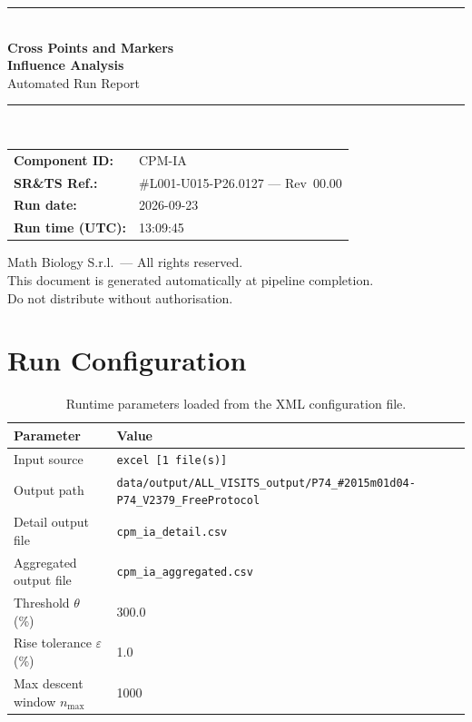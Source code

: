 \documentclass[a4paper,11pt]{article}
\begin{document}
\begin{titlepage}
\begin{center}
  \vspace*{1.8cm}
  {\color{dmaaccent}\rule{\linewidth}{1.5pt}}\\[0.6cm]
  {\LARGE\bfseries\color{dmaaccent}
    Cross Points and Markers\\[0.25cm]
    Influence Analysis}\\[0.4cm]
  {\Large Automated Run Report}\\[0.3cm]
  {\color{dmaaccent}\rule{\linewidth}{1.5pt}}\\[2cm]

  \begin{tabular}{ll}
    \textbf{Component ID:}   & CPM-IA \\[0.3cm]
    \textbf{SR\&TS Ref.:}    & \#L001-U015-P26.0127 --- Rev~00.00 \\[0.3cm]
    \textbf{Run date:}       & 2026-09-23 \\[0.3cm]
    \textbf{Run time (UTC):} & 13:09:45 \\
  \end{tabular}

  \vfill
  {\color{dmagray}\small
    Math Biology S.r.l.\ --- All rights reserved.\\
    This document is generated automatically at pipeline completion.\\
    Do not distribute without authorisation.}
\end{center}
\end{titlepage}

\tableofcontents
\clearpage

\section{Run Configuration}

\begin{table}[h!]
\centering
\small
\caption{Runtime parameters loaded from the XML configuration file.}
\begin{tabular}{ll}
\toprule
\textbf{Parameter} & \textbf{Value} \\
\midrule
Input source                      & \texttt{excel [1 file(s)]} \\
Output path                       & \texttt{data/output/ALL\_VISITS\_output/P74\_\#2015m01d04-P74\_V2379\_FreeProtocol} \\
Detail output file                & \texttt{cpm\_ia\_detail.csv} \\
Aggregated output file            & \texttt{cpm\_ia\_aggregated.csv} \\
Threshold $\theta$ (\%)           & 300.0 \\
Rise tolerance $\varepsilon$ (\%) & 1.0 \\
Max descent window $n_{\max}$     & 1000 \\
\bottomrule
\end{tabular}
\end{table}
\end{document}

